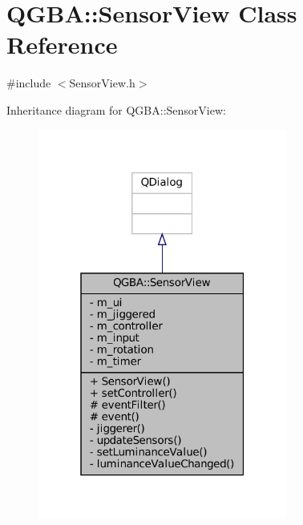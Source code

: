 \hypertarget{class_q_g_b_a_1_1_sensor_view}{}\section{Q\+G\+BA\+:\+:Sensor\+View Class Reference}
\label{class_q_g_b_a_1_1_sensor_view}


{\ttfamily \#include $<$Sensor\+View.\+h$>$}



Inheritance diagram for Q\+G\+BA\+:\+:Sensor\+View\+:
\nopagebreak
\begin{figure}[H]
\begin{center}
\leavevmode
\includegraphics[width=232pt]{class_q_g_b_a_1_1_sensor_view__inherit__graph}
\end{center}
\end{figure}


